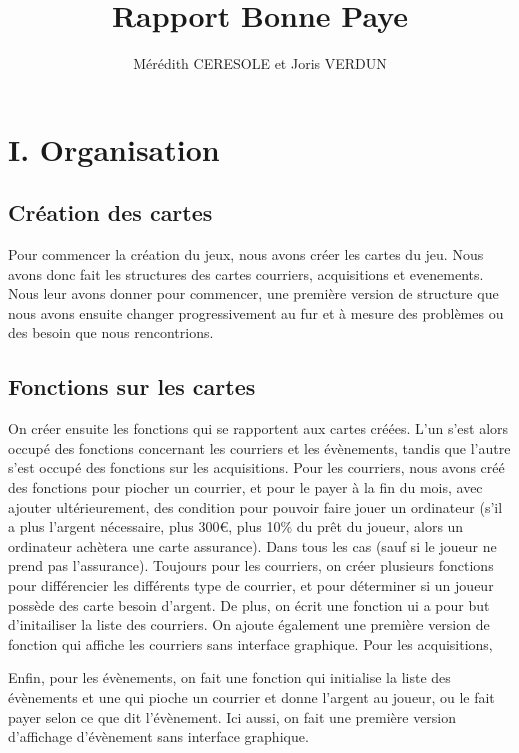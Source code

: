\documentclass[a4paper, 11pt]{report}
\title{Rapport Bonne Paye}
\author{Mérédith CERESOLE et Joris VERDUN}
\begin{document}
\maketitle

\newpage

\tableofcontents

\newpage

\section{I. Organisation}

\subsection{Création des cartes}
Pour commencer la création du jeux, nous avons créer les cartes du jeu. Nous avons donc fait les structures des cartes courriers, acquisitions et evenements.
Nous leur avons donner pour commencer, une première version de structure que nous avons ensuite changer progressivement au fur et à mesure des problèmes ou des besoin que nous rencontrions.


\subsection{Fonctions sur les cartes}
On créer ensuite les fonctions qui se rapportent aux cartes créées. L'un s'est alors occupé des fonctions concernant les courriers et les évènements, tandis que l'autre s'est occupé des fonctions sur les acquisitions. Pour les courriers, nous avons créé des fonctions pour piocher un courrier, et pour le payer à la fin du mois, avec ajouter ultérieurement, des condition pour pouvoir faire jouer un ordinateur (s'il a plus l'argent nécessaire, plus 300\euro{}, plus 10\% du prêt du joueur, alors un ordinateur achètera une carte assurance). Dans tous les cas (sauf si le joueur ne prend pas l'assurance). Toujours pour les courriers, on créer plusieurs fonctions pour différencier les différents type de courrier, et pour déterminer si un joueur possède des carte besoin d'argent. De plus, on écrit une fonction ui a pour but d'initailiser la liste des courriers. On ajoute également une première version de fonction qui affiche les courriers sans interface graphique.
Pour les acquisitions,





Enfin, pour les évènements, on fait une fonction qui initialise la liste des évènements et une qui pioche un courrier et donne l'argent au joueur, ou le fait payer selon ce que dit l'évènement. Ici aussi, on fait une première version d'affichage d'évènement sans interface graphique.
\end{document}
